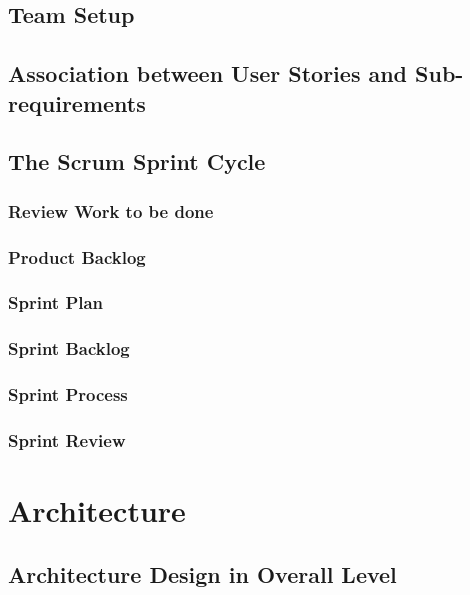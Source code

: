 \documentclass[conference]{IEEEtran}
\begin{document}
\subsection{\textbf{Team Setup}}



\subsection{\textbf{Association between User Stories and Sub-requirements}}

\subsection{\textbf{The Scrum Sprint Cycle}}

\subsubsection{\textbf{Review Work to be done}}


\subsubsection{\textbf{Product Backlog}}

\subsubsection{\textbf{Sprint Plan}}



\subsubsection{\textbf{Sprint Backlog}}

\subsubsection{\textbf{Sprint Process}}

\subsubsection{\textbf{Sprint Review}}


\section{\textbf{Architecture}}


\subsection{\textbf{Architecture Design in Overall Level}}
\end{document}

